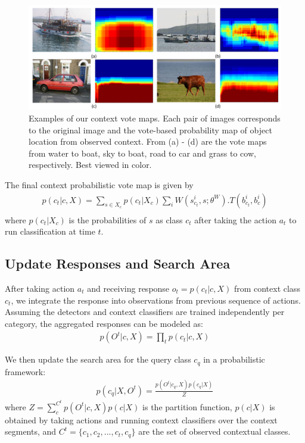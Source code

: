 \begin{figure}[ht!]
\begin{center}
\includegraphics[width=0.6\linewidth]{figures/votemap.pdf}
\end{center}
\caption{Examples of our context vote maps. Each pair of images corresponds to the original image and the vote-based probability map of object location from observed context. From (a) - (d) are the vote maps from water to boat, sky to boat, road to car and grass to cow, respectively. Best viewed in color.}
\label{fig:votemap}
\end{figure}



The final context probabilistic vote map is given by
\begin{eqnarray}
p(c_t|c,X) = \sum_{s\in X_c} p(c_t|X_c)\sum_i W(s_{c_t}^i,s;\theta^W).T(b_{c_t}^i,b_c^i)\nonumber\\
\end{eqnarray}
where $p(c_t|X_c)$ is the probabilities of $s$ as class $c_t$ after taking the action $a_t$ to run classification at time $t$.


\subsection{Update Responses and Search Area}
After taking action $a_t$ and receiving response $o_t = p(c_t|c, X)$ from context class $c_t$, we integrate the response into observations from previous sequence of actions. Assuming the detectors and context classifiers are trained independently per category, the aggregated responses can be modeled as:
\begin{eqnarray}
p(O^t|c, X) = \prod_t p(c_t|c,X)
\end{eqnarray}

We then update the search area for the query class $c_q$ in a probabilistic framework:
\begin{eqnarray}
p(c_q|X,O^t) = \frac{p(O^t|c_q,X)p(c_q|X)}{Z}
\end{eqnarray}
where $Z = \sum_c^{C^t} p(O^t|c,X)p(c|X)$ is the partition function, $p(c|X)$ is obtained by taking actions and running context classifiers over the context segments,  and $C^t = \{c_1, c_2, ..., c_t, c_q\}$ are the set of observed contextual classes.
